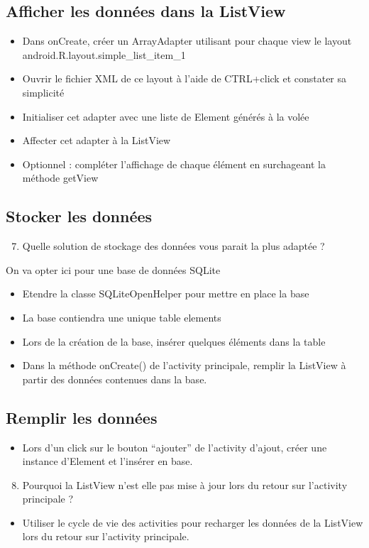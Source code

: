 \documentclass{article}
\begin{document}
 \subsection{Afficher les données dans la ListView}
 \begin{itemize}
  \item Dans onCreate, créer un ArrayAdapter utilisant pour chaque
  view le layout \\android.R.layout.simple\_list\_item\_1
  \item Ouvrir le fichier XML de ce layout à l'aide de CTRL+click et constater
  sa simplicité
  \item Initialiser cet adapter avec une liste de Element générés à la volée
  \item Affecter cet adapter à la ListView
  \item Optionnel : compléter l'affichage de chaque élément en surchageant la
  méthode getView
 \end{itemize}
  \subsection{Stocker les données}
  \begin{enumerate}
 \setcounter{enumi}{6}
\item Quelle solution de stockage des données vous parait la plus adaptée ?
\end{enumerate}
On va opter ici pour une base de données SQLite
 \begin{itemize}
  \item Etendre la classe SQLiteOpenHelper pour mettre en place la base
  \item La base contiendra une unique table elements
  \item Lors de la création de la base, insérer quelques éléments dans la table
  \item Dans la méthode onCreate() de l'activity principale, remplir la ListView
  à partir des données contenues dans la base.
 \end{itemize}
 \subsection{Remplir les données}
 \begin{itemize}
  \item Lors d'un click sur le bouton ``ajouter'' de l'activity d'ajout, créer
  une instance d'Element et l'insérer en base.
 \end{itemize}
  \begin{enumerate}
 \setcounter{enumi}{7}
\item Pourquoi la ListView n'est elle pas mise à jour lors du retour sur l'activity principale ?
\end{enumerate}
 \begin{itemize}
  \item Utiliser le cycle de vie des activities pour recharger les données de la ListView lors du retour sur l'activity principale.
 \end{itemize}
\end{document}

